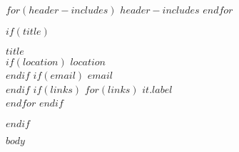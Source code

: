 \documentclass[11pt,a4paper]{article}
\begin{document}
$for(header-includes)$
$header-includes$
$endfor$

$if(title)$
\begin{center}
    {\Huge \textbf{\textcolor{mypurple}{$title$}}} \\[1mm]
    $if(location)$
        $location$ \\[1mm]
    $endif$
    $if(email)$
        \href{mailto:$email$}{$email$} \\[1mm]
    $endif$
    $if(links)$
        $for(links)$
            \href{$it.url$}{$it.label$} \\[1mm]
        $endfor$
    $endif$
\end{center}
$endif$

$body$
\end{document}
